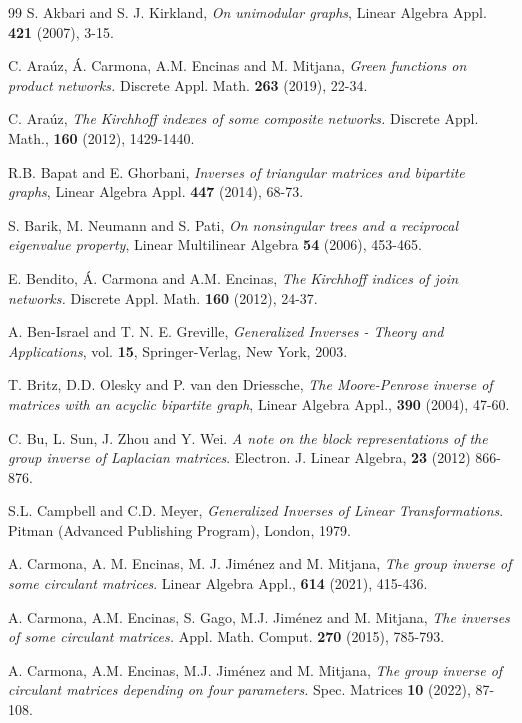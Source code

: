 \documentclass[notitlepage,12pt,reqno]{amsart}
\numberwithin{equation}{section}
\begin{document}
\begin{thebibliography}{99}
S. Akbari and S. J. Kirkland, {\it On unimodular graphs}, Linear Algebra Appl. {\bf 421} (2007), 3-15.

C. Araúz, \'{A}. Carmona, A.M. Encinas and M. Mitjana, {\it Green functions on product networks.} Discrete Appl. Math. {\bf 263} (2019), 22-34.

C. Araúz, {\it The Kirchhoff indexes of some composite networks.} Discrete Appl. Math., {\bf 160} (2012), 1429-1440.

R.B. Bapat and E. Ghorbani, {\it Inverses of triangular matrices and bipartite graphs}, Linear Algebra Appl. {\bf 447} (2014), 68-73.

S. Barik, M. Neumann and S. Pati, {\it On nonsingular trees and a reciprocal eigenvalue property}, Linear Multilinear Algebra {\bf 54} (2006), 453-465.

E. Bendito, \'{A}. Carmona and A.M. Encinas, {\it The Kirchhoff indices of join networks.} Discrete Appl. Math. {\bf 160} (2012), 24-37.

A. Ben-Israel and T. N. E. Greville, {\it Generalized Inverses - Theory and Applications}, vol. {\bf 15}, Springer-Verlag, New York, 2003.

T. Britz, D.D. Olesky and P. van den Driessche, {\it The Moore-Penrose inverse of matrices with an acyclic bipartite graph}, Linear Algebra Appl., {\bf 390} (2004), 47-60.

C. Bu, L. Sun, J. Zhou and Y. Wei. {\it A note on the block representations of the group inverse of Laplacian matrices}. Electron. J. Linear Algebra, {\bf 23} (2012) 866-876.

S.L. Campbell and C.D. Meyer, {\it Generalized Inverses of Linear Transformations}. Pitman (Advanced Publishing Program), London, 1979.

A. Carmona, A. M. Encinas, M. J. Jiménez and M. Mitjana, {\it The group inverse of some circulant matrices}. Linear Algebra Appl., {\bf 614} (2021), 415-436.

A. Carmona, A.M. Encinas, S. Gago, M.J. Jiménez and M. Mitjana, {\it The inverses of some circulant matrices.} Appl. Math. Comput. {\bf 270} (2015), 785-793.

A. Carmona, A.M. Encinas, M.J. Jiménez and M. Mitjana, {\it The group inverse of circulant matrices depending on four parameters.} Spec. Matrices {\bf 10} (2022), 87-108.


\end{thebibliography}
\end{document}
